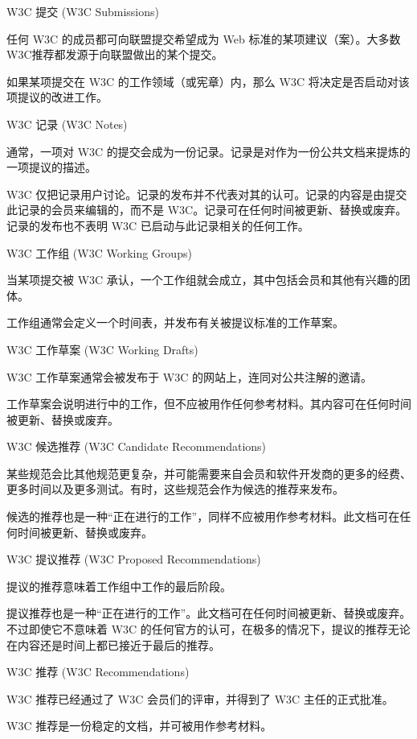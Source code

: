 \begin{compactenum}
\item W3C 提交 (W3C Submissions)

任何 W3C 的成员都可向联盟提交希望成为 Web 标准的某项建议（案）。大多数W3C推荐都发源于向联盟做出的某个提交。

如果某项提交在 W3C 的工作领域（或宪章）内，那么 W3C 将决定是否启动对该项提议的改进工作。

\item W3C 记录 (W3C Notes)

通常，一项对 W3C 的提交会成为一份记录。记录是对作为一份公共文档来提炼的一项提议的描述。

W3C 仅把记录用户讨论。记录的发布并不代表对其的认可。记录的内容是由提交此记录的会员来编辑的，而不是 W3C。记录可在任何时间被更新、替换或废弃。记录的发布也不表明 W3C 已启动与此记录相关的任何工作。

\item W3C 工作组 (W3C Working Groups)

当某项提交被 W3C 承认，一个工作组就会成立，其中包括会员和其他有兴趣的团体。

工作组通常会定义一个时间表，并发布有关被提议标准的工作草案。

\item W3C 工作草案 (W3C Working Drafts)

W3C 工作草案通常会被发布于 W3C 的网站上，连同对公共注解的邀请。

工作草案会说明进行中的工作，但不应被用作任何参考材料。其内容可在任何时间被更新、替换或废弃。

\item W3C 候选推荐 (W3C Candidate Recommendations)

某些规范会比其他规范更复杂，并可能需要来自会员和软件开发商的更多的经费、更多时间以及更多测试。有时，这些规范会作为候选的推荐来发布。

候选的推荐也是一种“正在进行的工作”，同样不应被用作参考材料。此文档可在任何时间被更新、替换或废弃。

\item W3C 提议推荐 (W3C Proposed Recommendations)

提议的推荐意味着工作组中工作的最后阶段。

提议推荐也是一种“正在进行的工作”。此文档可在任何时间被更新、替换或废弃。不过即使它不意味着 W3C 的任何官方的认可，在极多的情况下，提议的推荐无论在内容还是时间上都已接近于最后的推荐。

\item W3C 推荐 (W3C Recommendations)

W3C 推荐已经通过了 W3C 会员们的评审，并得到了 W3C 主任的正式批准。

W3C 推荐是一份稳定的文档，并可被用作参考材料。

\end{compactenum}





